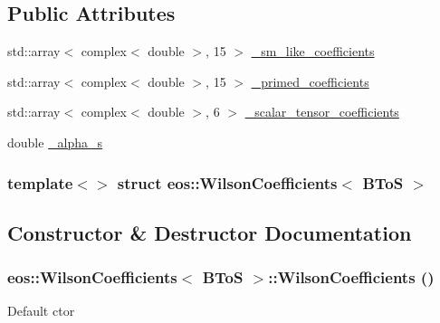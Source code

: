 \subsection*{Public Attributes}
\begin{DoxyCompactItemize}
\item 
std::array$<$ complex$<$ double $>$, 15 $>$ \hyperlink{structeos_1_1WilsonCoefficients_3_01BToS_01_4_ad55e5edfe673a97fe71981a429cb7152}{\_\-sm\_\-like\_\-coefficients}
\item 
std::array$<$ complex$<$ double $>$, 15 $>$ \hyperlink{structeos_1_1WilsonCoefficients_3_01BToS_01_4_a4c2aa2cde65c6c77df70e6fa87736ac7}{\_\-primed\_\-coefficients}
\item 
std::array$<$ complex$<$ double $>$, 6 $>$ \hyperlink{structeos_1_1WilsonCoefficients_3_01BToS_01_4_ac890d2d52439b631a8eaee283825dcc3}{\_\-scalar\_\-tensor\_\-coefficients}
\item 
double \hyperlink{structeos_1_1WilsonCoefficients_3_01BToS_01_4_ad988c930213682048f50ec4fa3390cc8}{\_\-alpha\_\-s}
\end{DoxyCompactItemize}
\subsubsection*{template$<$$>$ struct eos::WilsonCoefficients$<$ BToS $>$}



\subsection{Constructor \& Destructor Documentation}
\hypertarget{structeos_1_1WilsonCoefficients_3_01BToS_01_4_addf90ab27c34f993f61e6003d34514f3}{
\subsubsection[{WilsonCoefficients}]{\setlength{\rightskip}{0pt plus 5cm}eos::WilsonCoefficients$<$ {\bf BToS} $>$::WilsonCoefficients ()}}
\label{structeos_1_1WilsonCoefficients_3_01BToS_01_4_addf90ab27c34f993f61e6003d34514f3}
Default ctor 

